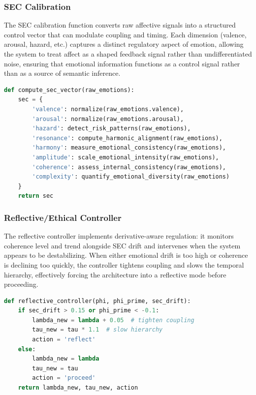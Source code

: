 \documentclass[11pt,a4paper]{article}
\begin{document}
\subsubsection{SEC Calibration}

The SEC calibration function converts raw affective signals into a structured control vector that can modulate coupling and timing. Each dimension (valence, arousal, hazard, etc.) captures a distinct regulatory aspect of emotion, allowing the system to treat affect as a shaped feedback signal rather than undifferentiated noise, ensuring that emotional information functions as a control signal rather than as a source of semantic inference.

\begin{lstlisting}[language=Python, caption={SEC calibration pseudocode}]
def compute_sec_vector(raw_emotions):
    sec = {
        'valence': normalize(raw_emotions.valence),
        'arousal': normalize(raw_emotions.arousal),
        'hazard': detect_risk_patterns(raw_emotions),
        'resonance': compute_harmonic_alignment(raw_emotions),
        'harmony': measure_emotional_consistency(raw_emotions),
        'amplitude': scale_emotional_intensity(raw_emotions),
        'coherence': assess_internal_consistency(raw_emotions),
        'complexity': quantify_emotional_diversity(raw_emotions)
    }
    return sec
\end{lstlisting}

\subsubsection{Reflective/Ethical Controller}

The reflective controller implements derivative-aware regulation: it monitors coherence level and trend alongside SEC drift and intervenes when the system appears to be destabilizing. When either emotional drift is too high or coherence is declining too quickly, the controller tightens coupling and slows the temporal hierarchy, effectively forcing the architecture into a reflective mode before proceeding.

\begin{lstlisting}[language=Python, caption={Reflective controller pseudocode}]
def reflective_controller(phi, phi_prime, sec_drift):
    if sec_drift > 0.15 or phi_prime < -0.1:
        lambda_new = lambda + 0.05  # tighten coupling
        tau_new = tau * 1.1  # slow hierarchy
        action = 'reflect'
    else:
        lambda_new = lambda
        tau_new = tau
        action = 'proceed'
    return lambda_new, tau_new, action
\end{lstlisting}
\end{document}
